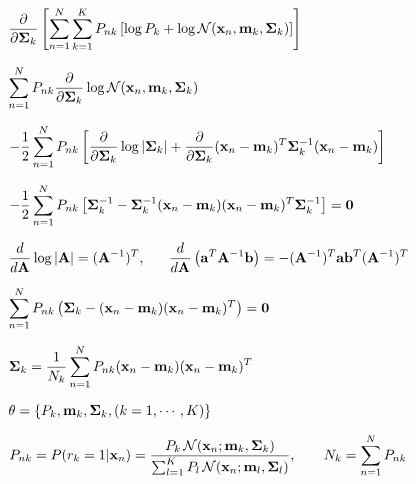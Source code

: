\documentclass{article}
\def\lthtmlcheckvsize{\ifdim\ht\sizebox<\vsize 
  \ifdim\wd\sizebox<\hsize\expandafter\hfill\fi \expandafter\vfill
  \else\expandafter\vss\fi}%
\begin{document}
{\newpage\clearpage
{}%
$\displaystyle \frac{\partial}{\partial{\bf\Sigma}_k}
\left[\sum_{n=1}^N \sum_{k=1}^K P_{nk}
\left[\log P_k+\log {\cal N}({\bf x}_n,{\bf m}_k,{\bf\Sigma}_k)\right]\right]$%
\lthtmlindisplaymathZ
\lthtmlcheckvsize\clearpage}

{\newpage\clearpage
{}%
$\displaystyle \sum_{n=1}^N P_{nk}\frac{\partial}{\partial{\bf\Sigma}_k}
\log {\cal N}({\bf x}_n,{\bf m}_k,{\bf\Sigma}_k)$%
\lthtmlindisplaymathZ
\lthtmlcheckvsize\clearpage}

{\newpage\clearpage
{}%
$\displaystyle -\frac{1}{2}\sum_{n=1}^N P_{nk}
\left[\frac{\partial}{\partial{\bf\Sigma}_k}\log|{\bf\Sigma}_k|
+\frac{\partial}{\partial{\bf\Sigma}_k}({\bf x}_n-{\bf m}_k)^T{\bf\Sigma}_k^{-1}({\bf x}_n-{\bf m}_k)\right]$%
\lthtmlindisplaymathZ
\lthtmlcheckvsize\clearpage}

{\newpage\clearpage
{}%
$\displaystyle -\frac{1}{2}\sum_{n=1}^N P_{nk}
\left[{\bf\Sigma}_k^{-1}-{\bf\Sigma}_k^{-1}
({\bf x}_n-{\bf m}_k)({\bf x}_n-{\bf m}_k)^T{\bf\Sigma}_k^{-1}\right]={\bf0}$%
\lthtmlindisplaymathZ
\lthtmlcheckvsize\clearpage}

{\newpage\clearpage
{}%
$\displaystyle \frac{d}{d{\bf A}}\log|{\bf A}|=({\bf A}^{-1})^T,
\;\;\;\;\;\;
\frac{d}{d{\bf A}} \left({\bf a}^T{\bf A}^{-1}{\bf b}\right)
=-({\bf A}^{-1})^T{\bf a}{\bf b}^T({\bf A}^{-1})^T$%
\lthtmlindisplaymathZ
\lthtmlcheckvsize\clearpage}

{\newpage\clearpage
{}%
$\displaystyle \sum_{n=1}^N P_{nk}\left({\bf\Sigma}_k-({\bf x}_n-{\bf m}_k)({\bf x}_n-{\bf m}_k)^T\right)={\bf0}$%
\lthtmlindisplaymathZ
\lthtmlcheckvsize\clearpage}

{\newpage\clearpage
{}%
$\displaystyle {\bf\Sigma}_k=\frac{1}{N_k}\sum_{n=1}^N P_{nk}({\bf x}_n-{\bf m}_k)({\bf x}_n-{\bf m}_k)^T$%
\lthtmlindisplaymathZ
\lthtmlcheckvsize\clearpage}

{\newpage\clearpage
{}%
$ {\bf\theta}=\{P_k,{\bf m}_k,{\bf\Sigma}_k,(k=1,\cdots,K)\}$%
\lthtmlindisplaymathZ
\lthtmlcheckvsize\clearpage}

{\newpage\clearpage
{}%
$\displaystyle P_{nk}=P(r_k=1|{\bf x}_n)=\frac{P_k\,{\cal N}({\bf x}_n;{\bf m}_k,{\bf\Sigma}_k)}
{\sum_{l=1}^K P_l\,{\cal N}({\bf x}_n;{\bf m}_l,{\bf\Sigma}_l)},
\;\;\;\;\;\;\;N_k=\sum_{n=1}^N P_{nk}$%
\lthtmlindisplaymathZ
\lthtmlcheckvsize\clearpage}
\end{document}
